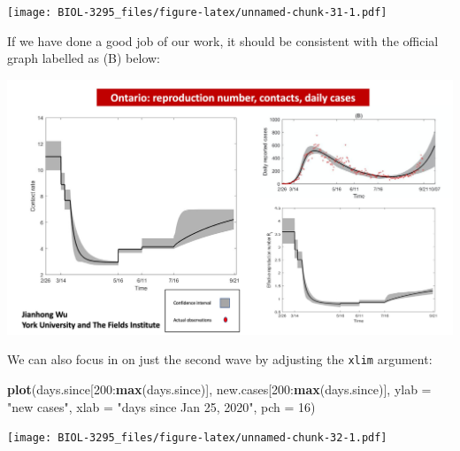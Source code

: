 \documentclass[]{book}
\newenvironment{Shaded}{\begin{snugshade}}{\end{snugshade}}
\newcommand{\KeywordTok}[1]{\textcolor[rgb]{0.13,0.29,0.53}{\textbf{{#1}}}}
\newcommand{\DataTypeTok}[1]{\textcolor[rgb]{0.13,0.29,0.53}{{#1}}}
\newcommand{\DecValTok}[1]{\textcolor[rgb]{0.00,0.00,0.81}{{#1}}}
\newcommand{\StringTok}[1]{\textcolor[rgb]{0.31,0.60,0.02}{{#1}}}
\newcommand{\NormalTok}[1]{{#1}}
\begin{document}
\begin{Shaded}
\end{Shaded}

\texttt{[image: BIOL-3295\_files/figure-latex/unnamed-chunk-31-1.pdf]}

If we have done a good job of our work, it should be consistent with the
official graph labelled as (B) below:

\includegraphics[width=1.2\linewidth]{figures/ONData}

We can also focus in on just the second wave by adjusting the
\texttt{xlim} argument:

\begin{Shaded}
\begin{Highlighting}[]
\KeywordTok{plot}\NormalTok{(days.since[}\DecValTok{200}\NormalTok{:}\KeywordTok{max}\NormalTok{(days.since)], new.cases[}\DecValTok{200}\NormalTok{:}\KeywordTok{max}\NormalTok{(days.since)], }\DataTypeTok{ylab =} \StringTok{"new cases"}\NormalTok{, }\DataTypeTok{xlab =} \StringTok{"days since Jan 25, 2020"}\NormalTok{, }\DataTypeTok{pch =} \DecValTok{16}\NormalTok{)}
\end{Highlighting}
\end{Shaded}

\texttt{[image: BIOL-3295\_files/figure-latex/unnamed-chunk-32-1.pdf]}
\end{document}
